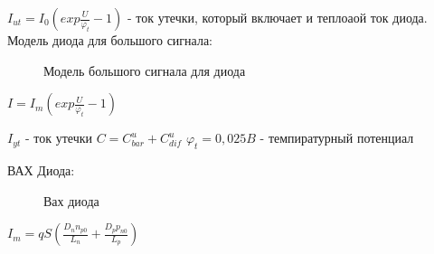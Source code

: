 \documentclass[12pt,a4paper]{article}
\begin{document}
$I_{ut} = I_0(exp\frac{U}{\varphi_t}-1)$ - ток утечки, который включает и теплоаой ток диода.
Модель диода для большого сигнала:
\begin{center}
\begin{figure}[h!]
		\caption{Модель большого сигнала для диода}	
		\label{VD3}
	\end{figure}
\end{center}	
$I=I_m(exp\frac{U}{\varphi_t}-1)$

$I_{yt}$ - ток утечки
$C=C^u_{bar}+C^u_{dif}
$
$\varphi_t=0,025B$ - темпиратурный потенциал

ВАХ Диода:
\begin{center}
\begin{figure}[h!]
		\caption{Вах диода}	
		\label{VAX}
	\end{figure}
\end{center}
$I_m=qS\left(\frac{D_n n_{p0}}{L_n}+\frac{D_p p_{n0}}{L_p}\right)$
\end{document}
